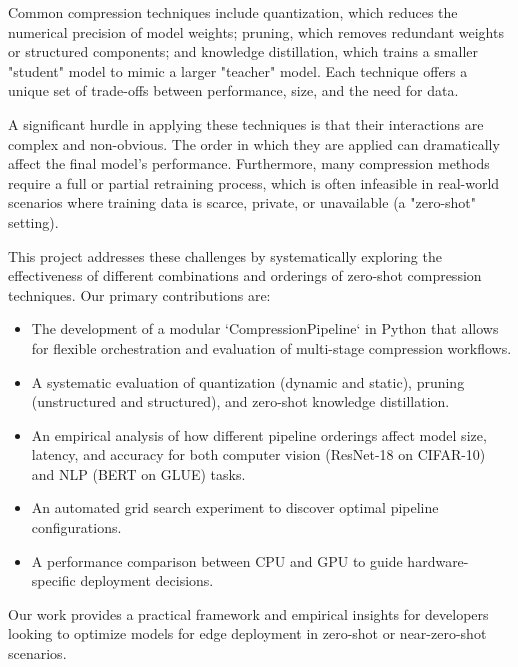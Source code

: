\documentclass[sigconf]{acmart}
\begin{document}
Common compression techniques include quantization, which reduces the numerical precision of model weights; pruning, which removes redundant weights or structured components; and knowledge distillation, which trains a smaller "student" model to mimic a larger "teacher" model. Each technique offers a unique set of trade-offs between performance, size, and the need for data.

A significant hurdle in applying these techniques is that their interactions are complex and non-obvious. The order in which they are applied can dramatically affect the final model's performance. Furthermore, many compression methods require a full or partial retraining process, which is often infeasible in real-world scenarios where training data is scarce, private, or unavailable (a "zero-shot" setting).

This project addresses these challenges by systematically exploring the effectiveness of different combinations and orderings of zero-shot compression techniques. Our primary contributions are:
\begin{itemize}
    \item The development of a modular `CompressionPipeline` in Python that allows for flexible orchestration and evaluation of multi-stage compression workflows.
    \item A systematic evaluation of quantization (dynamic and static), pruning (unstructured and structured), and zero-shot knowledge distillation.
    \item An empirical analysis of how different pipeline orderings affect model size, latency, and accuracy for both computer vision (ResNet-18 on CIFAR-10) and NLP (BERT on GLUE) tasks.
    \item An automated grid search experiment to discover optimal pipeline configurations.
    \item A performance comparison between CPU and GPU to guide hardware-specific deployment decisions.
\end{itemize}

Our work provides a practical framework and empirical insights for developers looking to optimize models for edge deployment in zero-shot or near-zero-shot scenarios.
\end{document}
